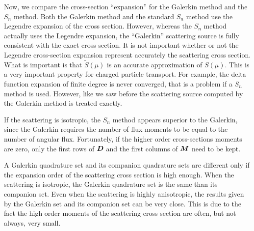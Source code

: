 Now, we compare the cross-section ``expansion'' for the Galerkin method and
the $S_n$ method. Both the Galerkin method and the standard $S_n$ method use
the Legendre expansion of the cross section. However, whereas the $S_n$ method
actually uses the Legendre expansion, the ``Galerkin'' scattering source is
fully consistent with the exact cross section. It is not
important whether or not the Legendre cross-section expansion represent
accurately the scattering cross section. What is important is that
$\tilde{S}(\mu)$ is an accurate approximation of $S(\mu)$. This is a very
important property for charged particle transport. For example, the delta
function expansion of finite degree is never converged, that is a problem if a 
$S_n$ method is used. However, like we saw before the scattering source computed 
by the Galerkin method is treated exactly.

If the scattering is isotropic, the $S_n$ method appears superior to the
Galerkin, since the Galerkin requires the number of flux moments to be equal
to the number of angular flux. Fortunately, if the higher order cross-sections
moments are zero, only the first rows of $\boldsymbol{D}$ and the first columns of
$\boldsymbol{M}$ need to be kept.

A Galerkin quadrature set and its companion quadrature sets are different only
if the expansion order of the scattering cross section is high enough. When the 
scattering is isotropic, the Galerkin quadrature set is the same than its
companion set. Even when the scattering is highly anisotropic, the results
given by the Galerkin set and its companion set can be very close. This is due
to the fact the high order moments of the scattering cross section are often,
but not always, very small.
